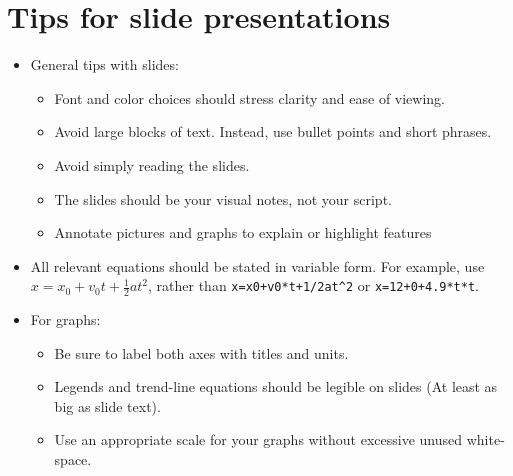 \section{Tips for slide presentations}
\begin{itemize}
	\item General tips with slides:
	\begin{itemize}
		\item Font and color choices should stress clarity and ease of viewing.
		\item Avoid large blocks of text. Instead, use bullet points and short phrases.
		\item Avoid simply reading the slides.
		\item The slides should be your visual notes, not your script.
		\item Annotate pictures and graphs to explain or highlight features
	\end{itemize}

	\item All relevant equations should be stated in variable form. For example, use $x = x_0 + v_0 t + \frac{1}{2} a t^2$, rather than \verb|x=x0+v0*t+1/2at^2| or \verb|x=12+0+4.9*t*t|.
	
	\item For graphs:
	\begin{itemize}
		\item Be sure to label both axes with titles and units.
		\item Legends and trend-line equations should be legible on slides (At least as big as slide text).
		\item Use an appropriate scale for your graphs without excessive unused white-space.
	\end{itemize}
\end{itemize}